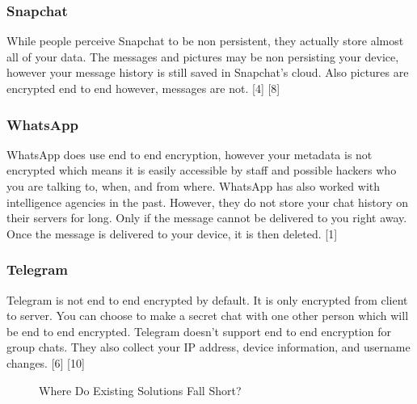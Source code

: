 \documentclass[11pt]{article}
\theoremstyle{plain}
\theoremstyle{definition}
\begin{document}
\subsubsection{Snapchat}
While people perceive Snapchat to be non persistent, they actually store almost all of your data. The messages and pictures may be non persisting your device, however your message history is still saved in Snapchat's cloud. Also pictures are encrypted end to end however, messages are not. [4] [8]
\subsubsection{WhatsApp}
WhatsApp does use end to end encryption, however your metadata is not encrypted which means it is easily accessible by staff and possible hackers who you are talking to, when, and from where. WhatsApp has also worked with intelligence agencies in the past. However, they do not store your chat history on their servers for long. Only if the message cannot be delivered to you right away. Once the message is delivered to your device, it is then deleted. [1]
\subsubsection{Telegram}
Telegram is not end to end encrypted by default. It is only encrypted from client to server. You can choose to make a secret chat with one other person which will be end to end encrypted. Telegram doesn't support end to end encryption for group chats. They also collect your IP address, device information, and username changes. [6] [10]

\begin{figure}
    \centering
    \caption{Where Do Existing Solutions Fall Short?}
    \label{fig:existingsols}
    \setlength{\tabcolsep}{4pt} %
\end{figure}
\end{document}
